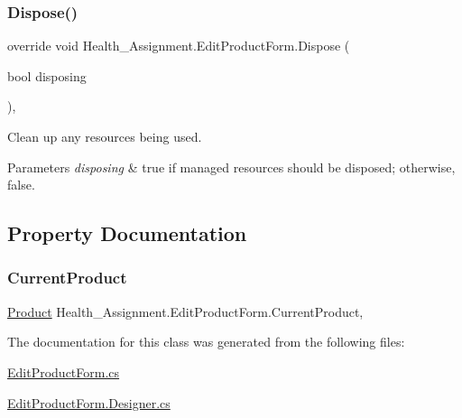 \subsubsection{\texorpdfstring{Dispose()}{Dispose()}}
{\footnotesize\ttfamily override void Health\+\_\+\+Assignment.\+Edit\+Product\+Form.\+Dispose (\begin{DoxyParamCaption}\item[{bool}]{disposing }\end{DoxyParamCaption})\hspace{0.3cm}{\ttfamily [inline]}, {\ttfamily [protected]}}



Clean up any resources being used. 


\begin{DoxyParams}{Parameters}
{\em disposing} & true if managed resources should be disposed; otherwise, false.\\
\hline
\end{DoxyParams}


\subsection{Property Documentation}
\mbox{\label{class_health___assignment_1_1_edit_product_form_a4951d94bd1a86fefc8314b6d4a822962}} 
\subsubsection{\texorpdfstring{Current\+Product}{CurrentProduct}}
{\footnotesize\ttfamily \hyperlink{class_health___assignment_1_1_product}{Product} Health\+\_\+\+Assignment.\+Edit\+Product\+Form.\+Current\+Product\hspace{0.3cm}{\ttfamily [get]}, {\ttfamily [set]}}



The documentation for this class was generated from the following files\+:\begin{DoxyCompactItemize}
\item 
\hyperlink{_edit_product_form_8cs}{Edit\+Product\+Form.\+cs}\item 
\hyperlink{_edit_product_form_8_designer_8cs}{Edit\+Product\+Form.\+Designer.\+cs}\end{DoxyCompactItemize}
